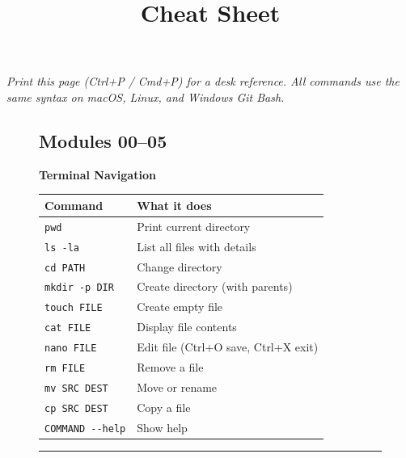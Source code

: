 \documentclass[
  9pt,
  a4paper,
  DIV=11,
  numbers=noendperiod]{scrartcl}
\title{Cheat Sheet}
\author{}
\date{}
\begin{document}
\maketitle

\emph{Print this page (Ctrl+P / Cmd+P) for a desk reference. All
commands use the same syntax on macOS, Linux, and Windows Git Bash.}

\begin{figure}

\begin{minipage}{0.50\linewidth}

\subsection{Modules 00--05}\label{modules-0005}

\textbf{Terminal Navigation}\end{minipage}%
%
\begin{minipage}{0.50\linewidth}

\begin{longtable}[]{@{}ll@{}}
\toprule\noalign{}
Command & What it does \\
\midrule\noalign{}
\endhead
\bottomrule\noalign{}
\endlastfoot
\texttt{pwd} & Print current directory \\
\texttt{ls\ -la} & List all files with details \\
\texttt{cd\ PATH} & Change directory \\
\texttt{mkdir\ -p\ DIR} & Create directory (with parents) \\
\texttt{touch\ FILE} & Create empty file \\
\texttt{cat\ FILE} & Display file contents \\
\texttt{nano\ FILE} & Edit file (Ctrl+O save, Ctrl+X exit) \\
\texttt{rm\ FILE} & Remove a file \\
\texttt{mv\ SRC\ DEST} & Move or rename \\
\texttt{cp\ SRC\ DEST} & Copy a file \\
\texttt{COMMAND\ -\/-help} & Show help \\
\end{longtable}

\end{minipage}%
\newline
\begin{minipage}{0.50\linewidth}

\begin{center}\rule{0.5\linewidth}{0.5pt}\end{center}


\end{minipage}
\end{figure}
\end{document}
